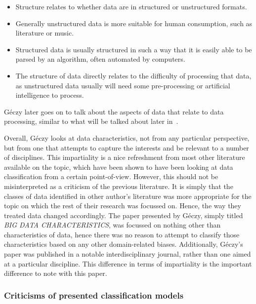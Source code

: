 \documentclass[a4paper,11pt]{article}
\begin{document}
\begin{itemize}
  \item Structure relates to whether data are in structured or unstructured formats.
  \item Generally unstructured data is more suitable for human consumption, such as literature or music.
  \item Structured data is usually structured in such a way that it is easily able to be parsed by an algorithm, often
  automated by computers.
  \item The structure of data directly relates to the difficulty of processing that data, as unstructured data usually
  will need some pre-processing or artificial intelligence to process.
\end{itemize}

G\'eczy later goes on to talk about the aspects of data that relate to data processing, similar to what will be talked
about later in~.

Overall, G\'eczy looks at data characteristics, not from any particular perspective, but from one that attempts to capture
the interests and be relevant to a number of disciplines. This impartiality is a nice refreshment from most other literature
available on the topic, which have been shown to have been looking at data classification from a certain point-of-view.
However, this should not be misinterpreted as a criticism of the previous literature. It is simply that the classes of
data identified in other author's literature was more appropriate for the topic on which the rest of their research was
focussed on. Hence, the way they treated data changed accordingly. The paper presented by G\'eczy, simply titled
\emph{BIG DATA CHARACTERISTICS}, was focussed on nothing other than characteristics of data, hence there was no reason
to attempt to classify those characteristics based on any other domain-related biases. Additionally, G\'eczy's paper was
published in a notable interdisciplinary journal, rather than one aimed at a particular discipline. This difference in
terms of impartiality is the important difference to note with this paper.



\subsubsection{Criticisms of presented classification models} %
\label{ssub:criticisms_of_previously_presented_models}
\end{document}

